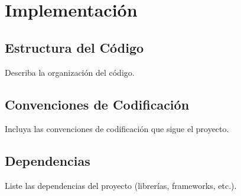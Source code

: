 	\chapter{Implementación}
	\section{Estructura del Código}
	Describa la organización del código.
	
	\section{Convenciones de Codificación}
	Incluya las convenciones de codificación que sigue el proyecto.
	
	\section{Dependencias}
	Liste las dependencias del proyecto (librerías, frameworks, etc.).
	
